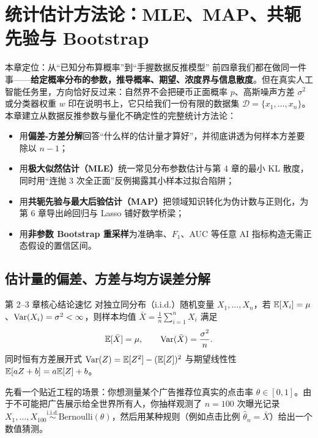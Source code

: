 \chapter[统计估计：MLE、MAP 与 Bootstrap]{统计估计方法论：MLE、MAP、共轭先验与 Bootstrap}
\label{ch:ch5-estimation-bootstrap}


\begin{chapIntro}{本章定位：从“已知分布算概率”到“手握数据反推模型”}
前四章我们都在做同一件事——\textbf{给定概率分布的参数，推导概率、期望、浓度界与信息散度}。但在真实人工智能任务里，方向恰好反过来：自然界不会把硬币正面概率 $p$、高斯噪声方差 $\sigma^2$ 或分类器权重 $w$ 印在说明书上，它只给我们一份有限的数据集 $\mathcal{D} = \{x_1, \dots, x_n\}$。本章建立从数据反推参数与量化不确定性的完整统计方法论：
\begin{itemize}
  \item 用\textbf{偏差-方差分解}回答“什么样的估计量才算好”，并彻底讲透为何样本方差要除以 $n-1$；
  \item 用\textbf{极大似然估计（MLE）}统一常见分布参数估计与第 4 章的最小 KL 散度，同时用“连抛 3 次全正面”反例揭露其小样本过拟合陷阱；
  \item 用\textbf{共轭先验与最大后验估计（MAP）}把领域知识转化为伪计数与正则化，为第 6 章导出岭回归与 Lasso 铺好数学桥梁；
  \item 用\textbf{非参数 Bootstrap 重采样}为准确率、$F_1$、AUC 等任意 AI 指标构造无需正态假设的置信区间。
\end{itemize}
\end{chapIntro}

\section{估计量的偏差、方差与均方误差分解}
\label{sec:ch5-bias-var-mse}

\begin{recallBox}{第 2--3 章核心结论速忆}
对独立同分布（i.i.d.）随机变量 $X_1, \dots, X_n$，若 $\mathbb{E}[X_i] = \mu$、$\operatorname{Var}(X_i) = \sigma^2 < \infty$，则样本均值 $\bar{X} = \frac{1}{n}\sum_{i=1}^n X_i$ 满足
\[
  \mathbb{E}[\bar{X}] = \mu, \qquad \operatorname{Var}(\bar{X}) = \frac{\sigma^2}{n}.
\]
同时恒有方差展开式 $\operatorname{Var}(Z) = \mathbb{E}[Z^2] - (\mathbb{E}[Z])^2$ 与期望线性性 $\mathbb{E}[aZ + b] = a\mathbb{E}[Z] + b$。
\end{recallBox}

先看一个贴近工程的场景：你想测量某个广告推荐位真实的点击率 $\theta \in [0,1]$。由于不可能把广告展示给全世界所有人，你抽样观测了 $n=100$ 次曝光记录 $X_1, \dots, X_{100} \stackrel{\text{i.i.d.}}{\sim} \mathrm{Bernoulli}(\theta)$，然后用某种规则（例如点击比例 $\hat{\theta}_n = \bar{X}$）给出一个数值猜测。


